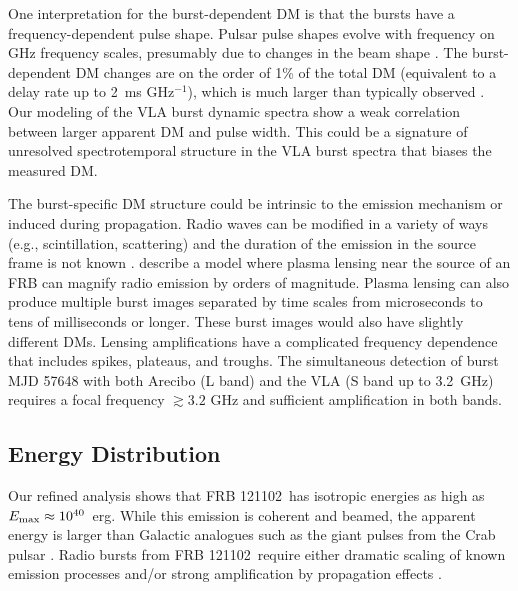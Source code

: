 \documentclass[twocolumn]{aastex61}
\newcommand{\frb}{FRB 121102}
\begin{document}
One interpretation for the burst-dependent DM is that the bursts have a frequency-dependent pulse shape. Pulsar pulse shapes evolve with frequency on GHz frequency scales, presumably due to changes in the beam shape \citep{1988MNRAS.234..477L}. The burst-dependent DM changes are on the order of 1\% of the total DM (equivalent to a delay rate up to 2~ms GHz$^{-1}$), which is much larger than typically observed \citep{2017MNRAS.466.3706L}. Our modeling of the VLA burst dynamic spectra show a weak correlation between larger apparent DM and pulse width. This could be a signature of unresolved spectrotemporal structure in the VLA burst spectra that biases the measured DM.

The burst-specific DM structure could be intrinsic to the emission mechanism or induced during propagation. Radio waves can be modified in a variety of ways (e.g., scintillation, scattering) and the duration of the emission in the source frame is not known \citep{2016arXiv160505890C}. \citet{2017arXiv170306580C} describe a model where plasma lensing near the source of an FRB can magnify radio emission by orders of magnitude. Plasma lensing can also produce multiple burst images separated by time scales from microseconds to tens of milliseconds or longer. These burst images would also have slightly different DMs. Lensing amplifications have a complicated frequency dependence that includes spikes, plateaus, and troughs. The simultaneous detection of burst MJD 57648 with both Arecibo (L band) and the VLA (S band up to 3.2~GHz) requires a focal frequency $\gtrsim 3.2$ GHz and sufficient amplification in both bands.   

\subsection{Energy Distribution}

Our refined analysis shows that \frb\ has isotropic energies as high as $E_{\rm{max}}\approx10^{40}$\ erg. While this emission is coherent and beamed, the apparent energy is larger than Galactic analogues such as the giant pulses from the Crab pulsar \citep[$\sim10^{35}$~erg, $T_{b,\rm{Crab}}\sim10^{41}$~K;][]{2003Natur.422..141H,2014PhRvD..89j3009K}. Radio bursts from \frb\ require either dramatic scaling of known emission processes \citep{2016MNRAS.462..941L, 2016MNRAS.457..232C} and/or strong amplification by propagation effects \citep{2017arXiv170306580C}.
\end{document}
